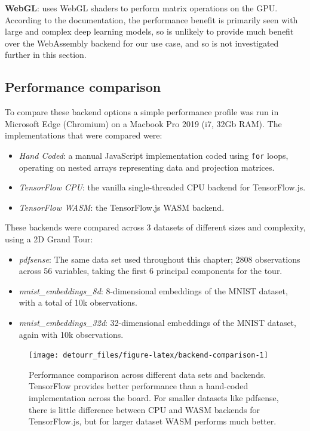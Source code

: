 \textbf{WebGL}: uses WebGL shaders to perform matrix operations on the GPU. According to the documentation, the performance benefit is primarily seen with large and complex deep learning models, so is unlikely to provide much benefit over the WebAssembly backend for our use case, and so is not investigated further in this section.

\hypertarget{performance-comparison}{%
\subsection{Performance comparison}\label{performance-comparison}}

To compare these backend options a simple performance profile was run in Microsoft Edge (Chromium) on a Macbook Pro 2019 (i7, 32Gb RAM). The implementations that were compared were:

\begin{itemize}
\tightlist
\item
  \emph{Hand Coded}: a manual JavaScript implementation coded using \texttt{for} loops, operating on nested arrays representing data and projection matrices.
\item
  \emph{TensorFlow CPU}: the vanilla single-threaded CPU backend for TensorFlow.js.
\item
  \emph{TensorFlow WASM}: the TensorFlow.js WASM backend.
\end{itemize}

These backends were compared across 3 datasets of different sizes and complexity, using a 2D Grand Tour:

\begin{itemize}
\tightlist
\item
  \emph{pdfsense}: The same data set used throughout this chapter; 2808 observations across 56 variables, taking the first 6 principal components for the tour.
\item
  \emph{mnist\_embeddings\_8d}: 8-dimensional embeddings of the MNIST dataset, with a total of 10k observations.
\item
  \emph{mnist\_embeddings\_32d}: 32-dimensional embeddings of the MNIST dataset, again with 10k observations.
\end{itemize}

\begin{figure}

{\centering \texttt{[image: detourr\_files/figure-latex/backend-comparison-1]} 

}

\caption{Performance comparison across different data sets and backends. TensorFlow provides better performance than a hand-coded implementation across the board. For smaller datasets like pdfsense, there is little difference between CPU and WASM backends for TensorFlow.js, but for larger dataset WASM performs much better.}\label{fig:backend-comparison}
\end{figure}

